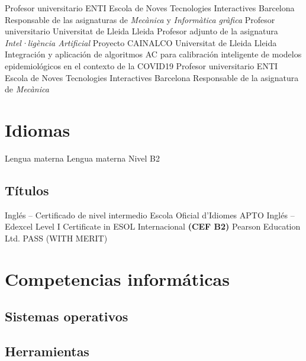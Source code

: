 \documentclass{cv}
\begin{document}
	{Profesor universitario}
	{ENTI Escola de Noves Tecnologies Interactives}
	{Barcelona}
	{}
	{Responsable de las asignaturas de \textit{Mecànica} y \textit{Informàtica gràfica}}
	{Profesor universitario}
	{Universitat de Lleida}
	{Lleida}
	{}
	{Profesor adjunto de la asignatura \textit{Intel·ligència Artificial}}
	{Proyecto CAINALCO}
	{Universitat de Lleida}
	{Lleida}
	{}
	{Integración y aplicación de algoritmos AC para calibración inteligente
	de modelos epidemiológicos en el contexto de la COVID19}
	{Profesor universitario}
	{ENTI Escola de Noves Tecnologies Interactives}
	{Barcelona}
	{}
	{Responsable de la asignatura de \textit{Mecànica}}

\section{Idiomas}
	{Lengua materna}
	{}
	{Lengua materna}
	{}
	{Nivel B2}
	{}

\subsection{Títulos}
	{Inglés -- Certificado de nivel intermedio}
	{Escola Oficial d'Idiomes}
	{}
	{APTO}
	{}
	{Inglés -- Edexcel Level I Certificate in ESOL Internacional
		\textbf{(CEF B2)}}
	{Pearson Education Ltd.}
	{}
	{PASS (WITH MERIT)}
	{}


\section{Competencias informáticas}
\subsection{Sistemas operativos}

\subsection{Herramientas}
\end{document}

